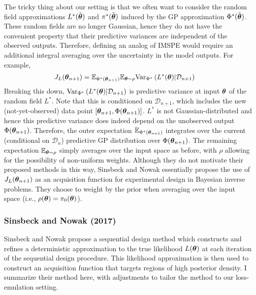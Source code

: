 \documentclass[12pt]{article}
\begin{document}
The tricky thing about our setting is that we often want to consider the random field approximations $L^*(\tilde{\boldsymbol{\theta}})$ and $\pi^*(\tilde{\boldsymbol{\theta}})$ induced by the GP approximation 
$\Phi^*(\tilde{\boldsymbol{\theta}})$. These random fields are no longer Gaussian, hence they do not have the convenient property that their predictive variances are independent of the observed 
outputs. Therefore, defining an analog of IMSPE would require an additional integral averaging over the uncertainty in the model outputs. For example, 
\begin{align*}
J_{L}(\boldsymbol{\theta}_{n+1}) &= \mathbb{E}_{\Phi^*(\boldsymbol{\theta}_{n+1})} \mathbb{E}_{\boldsymbol{\theta} \sim \rho} \mathrm{Var}_{\Phi^*} \left(L^*(\boldsymbol{\theta}) | \mathcal{D}_{n+1} \right)
\end{align*}
Breaking this down, $\mathrm{Var}_{\Phi^*} \left(L^*(\boldsymbol{\theta}) | \mathcal{D}_{n+1} \right)$ is predictive variance at input $\boldsymbol{\theta}$ of the random field $L^*$. Note that this is conditioned on 
$\mathcal{D}_{n+1}$, which includes the new (not-yet-observed) data point $[\boldsymbol{\theta}_{n+1}, \Phi(\boldsymbol{\theta}_{n+1})]$. $L^*$ is not Gaussian-distributed and hence this predictive variance
does indeed depend on the unobserved output $\Phi(\boldsymbol{\theta}_{n+1})$. Therefore, the outer expectation $ \mathbb{E}_{\Phi^*(\boldsymbol{\theta}_{n+1})}$ integrates over the current 
(conditional on $\mathcal{D}_n$) predictive GP distribution over $\Phi(\boldsymbol{\theta}_{n+1})$. The remaining expectation $\mathbb{E}_{\boldsymbol{\theta} \sim \rho}$ simply averages over the input 
space as before, with $\rho$ allowing for the possibility of non-uniform weights. Although they do not motivate their proposed methods in this way, Sinsbeck and Nowak 
\cite{doi:10.1137/15M1047659} essentially propose the use of $J_{L}(\boldsymbol{\theta}_{n+1})$ as an acquisition function for experimental design in Bayesian inverse problems. They 
choose to weight by the prior when averaging over the input space (i.e., $\rho(\boldsymbol{\theta}) = \pi_0(\boldsymbol{\theta})$). 

\subsubsection{Sinsbeck and Nowak (2017)}
Sinsbeck and Nowak \cite{doi:10.1137/15M1047659} propose a sequential design method which constructs and refines a deterministic approximation to the true likelihood $L(\boldsymbol{\theta})$ at each iteration of the sequential design procedure. 
This likelihood approximation is then used to construct an acquisition function that targets regions of high posterior density. I summarize their method here, with adjustments to tailor the method to our loss-emulation setting. 
\end{document}
